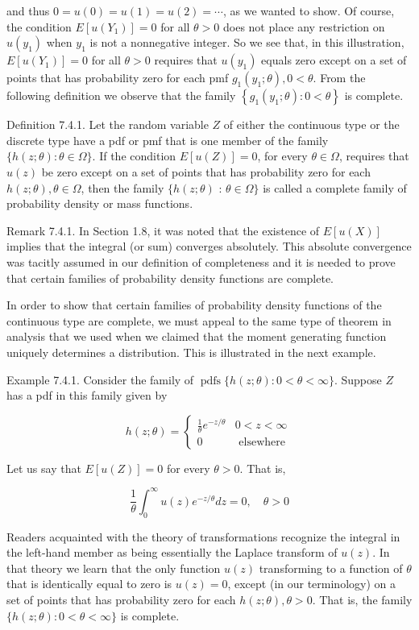 and thus $0=u(0)=u(1)=u(2)=\cdots$, as we wanted to show. Of course, the condition $E\left[u\left(Y_{1}\right)\right]=0$ for all $\theta>0$ does not place any restriction on $u\left(y_{1}\right)$ when $y_{1}$ is not a nonnegative integer. So we see that, in this illustration, $E\left[u\left(Y_{1}\right)\right]=0$ for all $\theta>0$ requires that $u\left(y_{1}\right)$ equals zero except on a set of points that has probability zero for each pmf $g_{1}\left(y_{1} ; \theta\right), 0<\theta$. From the following definition we observe that the family $\left\{g_{1}\left(y_{1} ; \theta\right): 0<\theta\right\}$ is complete.

Definition 7.4.1. Let the random variable $Z$ of either the continuous type or the discrete type have a pdf or pmf that is one member of the family $\{h(z ; \theta): \theta \in \Omega\}$. If the condition $E[u(Z)]=0$, for every $\theta \in \Omega$, requires that $u(z)$ be zero except on a set of points that has probability zero for each $h(z ; \theta), \theta \in \Omega$, then the family $\{h(z ; \theta)$ : $\theta \in \Omega\}$ is called a complete family of probability density or mass functions.

Remark 7.4.1. In Section 1.8, it was noted that the existence of $E[u(X)]$ implies that the integral (or sum) converges absolutely. This absolute convergence was tacitly assumed in our definition of completeness and it is needed to prove that certain families of probability density functions are complete.

In order to show that certain families of probability density functions of the continuous type are complete, we must appeal to the same type of theorem in analysis that we used when we claimed that the moment generating function uniquely determines a distribution. This is illustrated in the next example.

Example 7.4.1. Consider the family of $\operatorname{pdfs}\{h(z ; \theta): 0<\theta<\infty\}$. Suppose $Z$ has a pdf in this family given by

$$
h(z ; \theta)= \begin{cases}\frac{1}{\theta} e^{-z / \theta} & 0<z<\infty \\ 0 & \text { elsewhere }\end{cases}
$$

Let us say that $E[u(Z)]=0$ for every $\theta>0$. That is,

$$
\frac{1}{\theta} \int_{0}^{\infty} u(z) e^{-z / \theta} d z=0, \quad \theta>0
$$

Readers acquainted with the theory of transformations recognize the integral in the left-hand member as being essentially the Laplace transform of $u(z)$. In that theory we learn that the only function $u(z)$ transforming to a function of $\theta$ that is identically equal to zero is $u(z)=0$, except (in our terminology) on a set of points that has probability zero for each $h(z ; \theta), \theta>0$. That is, the family $\{h(z ; \theta): 0<\theta<\infty\}$ is complete.

